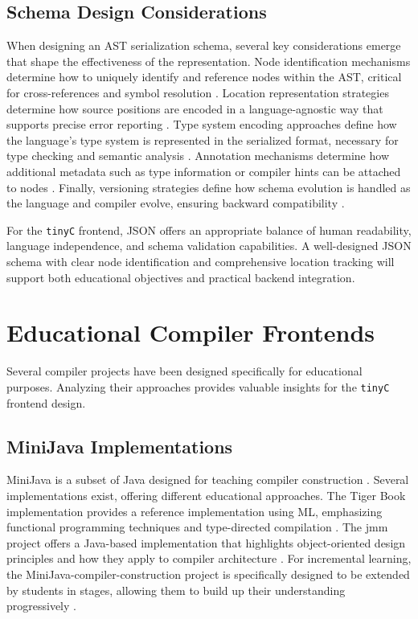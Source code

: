 \subsection{Schema Design Considerations}

When designing an AST serialization schema, several key considerations emerge that shape the effectiveness of the representation. Node identification mechanisms determine how to uniquely identify and reference nodes within the AST, critical for cross-references and symbol resolution \cite{parr2010language}. Location representation strategies determine how source positions are encoded in a language-agnostic way that supports precise error reporting \cite{parr2013definitive}. Type system encoding approaches define how the language's type system is represented in the serialized format, necessary for type checking and semantic analysis \cite{appel2004modern}. Annotation mechanisms determine how additional metadata such as type information or compiler hints can be attached to nodes \cite{appel2004modern}. Finally, versioning strategies define how schema evolution is handled as the language and compiler evolve, ensuring backward compatibility \cite{varda2008protocol}.

For the \texttt{tinyC} frontend, JSON offers an appropriate balance of human readability, language independence, and schema validation capabilities. A well-designed JSON schema with clear node identification and comprehensive location tracking will support both educational objectives and practical backend integration.



\pagebreak

\section{Educational Compiler Frontends}

Several compiler projects have been designed specifically for educational purposes. Analyzing their approaches provides valuable insights for the \texttt{tinyC} frontend design.

\subsection{MiniJava Implementations}

MiniJava is a subset of Java designed for teaching compiler construction \cite{appel1998modern}. Several implementations exist, offering different educational approaches. The Tiger Book implementation provides a reference implementation using ML, emphasizing functional programming techniques and type-directed compilation \cite{appel1998modern}. The jmm project offers a Java-based implementation that highlights object-oriented design principles and how they apply to compiler architecture \cite{patel2021comparing}. For incremental learning, the MiniJava-compiler-construction project is specifically designed to be extended by students in stages, allowing them to build up their understanding progressively \cite{patel2021comparing}.

